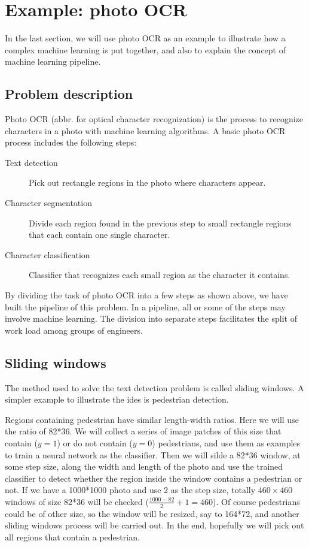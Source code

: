 \ifx\PREAMBLE\undefined


\fi
\section{Example: photo OCR}
In the last section, we will use photo OCR as an example to illustrate how a complex machine learning is put together, and also to explain the concept of machine learning pipeline.
\subsection{Problem description}
Photo OCR (abbr. for optical character recognization) is the process to recognize characters in a photo with machine learning algorithms. A basic photo OCR process includes the following steps:
\begin{description}
\item [Text detection] Pick out rectangle regions in the photo where characters appear.
\item [Character segmentation] Divide each region found in the previous step to small rectangle regions that each contain one single character. 
\item [Character classification] Classifier that recognizes each small region as the character it contains.
\end{description}
By dividing the task of photo OCR into a few steps as shown above, we have built the pipeline of this problem. In a pipeline, all or some of the steps may involve machine learning. The division into separate steps facilitates the split of work load among groups of engineers.
\subsection{Sliding windows}
The method used to solve the text detection problem is called sliding windows. A simpler example to illustrate the ides is pedestrian detection.

Regions containing pedestrian have similar length-width ratios. Here we will use the ratio of 82*36. We will collect a series of image patches of this size that contain ($y=1$) or do not contain ($y=0$) pedestrians, and use them as examples to train a neural network as the classifier. Then we will silde a 82*36 window, at some step size, along the width and length of the photo and use the trained classifier to detect whether the region inside the window contains a pedestrian or not. If we have a 1000*1000 photo and use 2 as the step size, totally $460\times 460$ windows of size 82*36 will be checked ($\frac{1000-82}{2} + 1 = 460$). Of course pedestrians could be of other size, so the window will be resized, say to 164*72, and another sliding windows process will be carried out. In the end, hopefully we will pick out all regions that contain a pedestrian.

